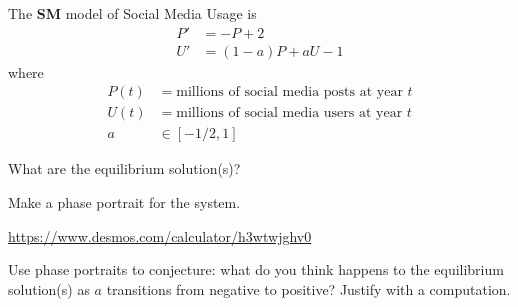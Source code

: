 \documentclass{workbook}
\begin{document}
\begin{slide}
	\question
	The \textbf{SM} model of Social Media Usage is
	\begin{align*}
		P'&=-P+2\\
		U'&=(1-a)P + aU - 1
	\end{align*}
	where
	\begin{align*}
		P(t) &= \text{millions of social media posts at year $t$}\\
		U(t) &= \text{millions of social media users at year $t$}\\
		a &\in [-1/2, 1]
	\end{align*}

	\begin{parts}
		\item What are the equilibrium solution(s)?
		\item Make a phase portrait for the system.
		
		{\small \url{https://www.desmos.com/calculator/h3wtwjghv0}}
		\item Use phase portraits to conjecture: what do you think happens to the equilibrium
			solution(s) as $a$ transitions from negative to positive? Justify with a computation.
	\end{parts}
\end{slide}
\end{document}
